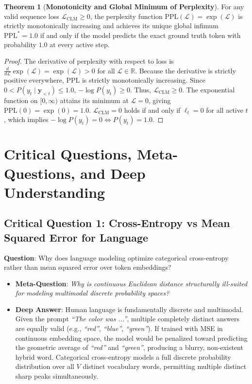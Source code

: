 \documentclass[11pt,a4paper]{article}
\theoremstyle{definition}
\newtheorem{theorem}{\textbf{Theorem}}[section]
\begin{document}
\begin{theorem}[\textbf{Monotonicity and Global Minimum of Perplexity}]
For any valid sequence loss $\mathcal{L}_{\text{CLM}} \ge 0$, the perplexity function $\text{PPL}(\mathcal{L}) = \exp(\mathcal{L})$ is strictly monotonically increasing and achieves its unique global infimum $\text{PPL}^* = 1.0$ if and only if the model predicts the exact ground truth token with probability $1.0$ at every active step.
\end{theorem}

\begin{proof}
The derivative of perplexity with respect to loss is $\frac{d}{d \mathcal{L}} \exp(\mathcal{L}) = \exp(\mathcal{L}) > 0$ for all $\mathcal{L} \in \mathbb{R}$. Because the derivative is strictly positive everywhere, $\text{PPL}$ is strictly monotonically increasing.
Since $0 < P(y_t \mid \mathbf{y}_{<t}) \le 1.0$, $-\log P(y_t) \ge 0$. Thus, $\mathcal{L}_{\text{CLM}} \ge 0$.
The exponential function on $[0, \infty)$ attains its minimum at $\mathcal{L} = 0$, giving $\text{PPL}(0) = \exp(0) = 1.0$.
$\mathcal{L}_{\text{CLM}} = 0$ holds if and only if $\ell_t = 0$ for all active $t$, which implies $-\log P(y_t) = 0 \iff P(y_t) = 1.0$.
\end{proof}

\section{Critical Questions, Meta-Questions, and Deep Understanding}

\subsection{\textbf{Critical Question 1: Cross-Entropy vs Mean Squared Error for Language}}
\textbf{Question}: Why does language modeling optimize categorical cross-entropy rather than mean squared error over token embeddings?
\begin{itemize}
    \item \textbf{Meta-Question}: \emph{Why is continuous Euclidean distance structurally ill-suited for modeling multimodal discrete probability spaces?}
    \item \textbf{Deep Answer}: Human language is fundamentally discrete and multimodal. Given the prompt \emph{``The color was ...''}, multiple completely distinct answers are equally valid (e.g., \emph{``red''}, \emph{``blue''}, \emph{``green''}). If trained with MSE in continuous embedding space, the model would be penalized toward predicting the geometric average of \emph{``red''} and \emph{``green''}, producing a blurry, non-existent hybrid word. Categorical cross-entropy models a full discrete probability distribution over all $V$ distinct vocabulary words, permitting multiple distinct sharp peaks simultaneously.
\end{itemize}
\end{document}
